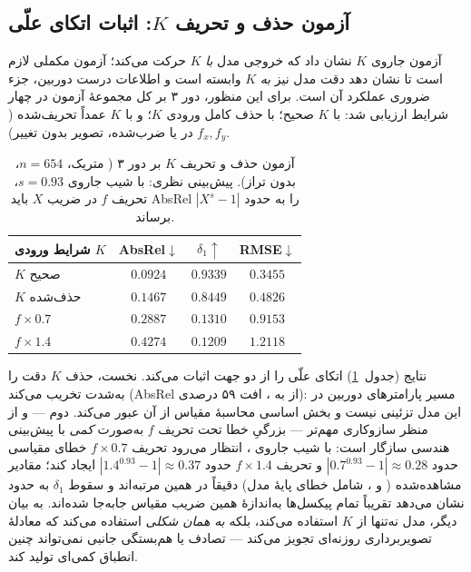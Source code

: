 \subsection{آزمون حذف و تحریف $K$: اثبات اتکای علّی}
\label{subsec:k_knockout}

آزمون جاروی $K$ نشان داد که خروجی مدل \emph{با} $K$ حرکت می‌کند؛ آزمون مکملی لازم است تا نشان دهد دقت مدل نیز \emph{به} $K$ وابسته است و اطلاعات درست دوربین، جزء ضروری عملکرد آن است. برای این منظور، \proposedmodel{} دور ۳ بر کل مجموعهٔ آزمون در چهار شرایط ارزیابی شد: با $K$ صحیح؛ با حذف کامل ورودی $K$؛ و با $K$ عمداً تحریف‌شده ($f_x, f_y$ در  یا  ضرب‌شده، تصویر بدون تغییر).

\begin{table}[htbp]
\centering
\caption{آزمون حذف و تحریف $K$ بر \proposedmodel{} دور ۳ ( متریک، $n=654$، بدون تراز). پیش‌بینی نظری: با شیب جاروی $s=0.93$، تحریف $f$ در ضریب $X$ باید AbsRel را به حدود $|X^{s}-1|$ برساند.}
\label{tab:k_knockout}
\begin{tabular}{lccc}
\hline
شرایط ورودی $K$ & AbsRel$\downarrow$ & $\delta_1\uparrow$ & RMSE$\downarrow$ \\ \hline
$K$ صحیح & $\mathbf{0.0924}$ & $\mathbf{0.9339}$ & $\mathbf{0.3455}$ \\
$K$ حذف‌شده & $0.1467$ & $0.8449$ & $0.4826$ \\
$f \times 0.7$ & $0.2887$ & $0.1310$ & $0.9153$ \\
$f \times 1.4$ & $0.4274$ & $0.1209$ & $1.2118$ \\ \hline
\end{tabular}
\end{table}

نتایج (جدول~\ref{tab:k_knockout}) اتکای علّی را از دو جهت اثبات می‌کند. نخست، حذف $K$ دقت را به‌شدت تخریب می‌کند (AbsRel از  به ، افت ۵۹ درصدی): مسیر پارامترهای دوربین در این مدل تزئینی نیست و بخش اساسی محاسبهٔ مقیاس از آن عبور می‌کند. دوم --- و از منظر سازوکاری مهم‌تر --- بزرگیِ خطا تحت تحریف $f$ به‌صورت \emph{کمی} با پیش‌بینی هندسی سازگار است: با شیب جاروی ، انتظار می‌رود تحریف $f\times0.7$ خطای مقیاسی حدود $|0.7^{0.93}-1| \approx 0.28$ و تحریف $f\times1.4$ حدود $|1.4^{0.93}-1| \approx 0.37$ ایجاد کند؛ مقادیر مشاهده‌شده ( و ، شامل خطای پایهٔ مدل) دقیقاً در همین مرتبه‌اند و سقوط $\delta_1$ به حدود  نشان می‌دهد تقریباً تمام پیکسل‌ها به‌اندازهٔ همین ضریب مقیاس جابه‌جا شده‌اند. به بیان دیگر، مدل نه‌تنها از $K$ استفاده می‌کند، بلکه \emph{به همان شکلی} استفاده می‌کند که معادلهٔ تصویربرداری روزنه‌ای تجویز می‌کند --- تصادف یا هم‌بستگی جانبی نمی‌تواند چنین انطباق کمی‌ای تولید کند.

